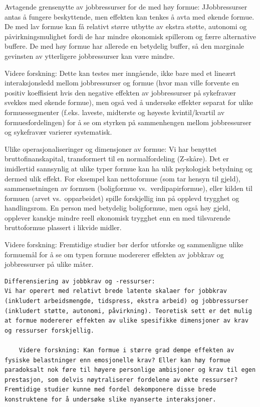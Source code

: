 \documentclass[
  12pt,
  a4paper,
  DIV=11,
  numbers=noendperiod]{scrartcl}
\begin{document}
Avtagende grensenytte av jobbressurser for de med høy formue:
JJobbressurser antas å fungere beskyttende, men effekten kan tenkes å
avta med økende formue. De med lav formue kan få relativt større utbytte
av ekstra støtte, autonomi og påvirkningsmulighet fordi de har mindre
økonomisk spillerom og færre alternative buffere. De med høy formue har
allerede en betydelig buffer, så den marginale gevinsten av ytterligere
jobbressurser kan være mindre.

Videre forskning: Dette kan testes mer inngående, ikke bare med et
lineært interaksjonsledd mellom jobbressurser og formue (hvor man ville
forvente en positiv koeffisient hvis den negative effekten av
jobbressurser på sykefravær svekkes med økende formue), men også ved å
undersøke effekter separat for ulike formuessegmenter (f.eks. laveste,
midterste og høyeste kvintil/kvartil av formuesfordelingen) for å se om
styrken på sammenhengen mellom jobbressurser og sykefravær varierer
systematisk.

Ulike operasjonaliseringer og dimensjoner av formue: Vi har benyttet
bruttofinanskapital, transformert til en normalfordeling (Z-skåre). Det
er imidlertid sannsynlig at ulike typer formue kan ha ulik psykologisk
betydning og dermed ulik effekt. For eksempel kan nettoformue (som tar
hensyn til gjeld), sammensetningen av formuen (boligformue
vs.~verdipapirformue), eller kilden til formuen (arvet vs.~opparbeidet)
spille forskjellig inn på opplevd trygghet og handlingsrom. En person
med betydelig boligformue, men også høy gjeld, opplever kanskje mindre
reell økonomisk trygghet enn en med tilsvarende bruttoformue plassert i
likvide midler.

Videre forskning: Fremtidige studier bør derfor utforske og sammenligne
ulike formuemål for å se om typen formue modererer effekten av jobbkrav
og jobbressurser på ulike måter.

\begin{verbatim}
Differensiering av jobbkrav og -ressurser:
Vi har operert med relativt brede latente skalaer for jobbkrav (inkludert arbeidsmengde, tidspress, ekstra arbeid) og jobbressurser (inkludert støtte, autonomi, påvirkning). Teoretisk sett er det mulig at formue modererer effekten av ulike spesifikke dimensjoner av krav og ressurser forskjellig.

    Videre forskning: Kan formue i større grad dempe effekten av fysiske belastninger enn emosjonelle krav? Eller kan høy formue paradoksalt nok føre til høyere personlige ambisjoner og krav til egen prestasjon, som delvis nøytraliserer fordelene av økte ressurser? Fremtidige studier kunne med fordel dekomponere disse brede konstruktene for å undersøke slike nyanserte interaksjoner.
\end{verbatim}
\end{document}
